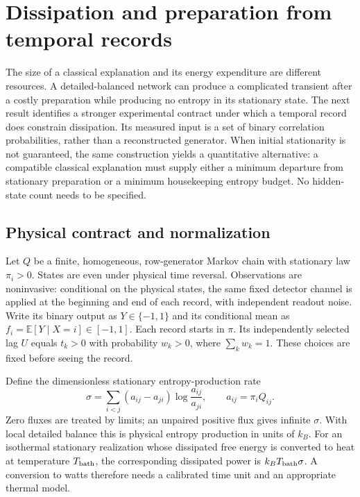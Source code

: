 \chapter{Dissipation and preparation from temporal records}
\label{ch:rf-thermodynamic}

The size of a classical explanation and its energy expenditure are different
resources. A detailed-balanced network can produce a complicated transient
after a costly preparation while producing no entropy in its stationary
state. The next result identifies a stronger experimental contract under which
a temporal record does constrain dissipation. Its measured input is a set of
binary correlation probabilities, rather than a reconstructed generator.
When initial stationarity is not guaranteed, the same construction yields a
quantitative alternative: a compatible classical explanation must supply
either a minimum departure from stationary preparation or a minimum
housekeeping entropy budget. No hidden-state count needs to be specified.

\section{Physical contract and normalization}

Let $Q$ be a finite, homogeneous, row-generator Markov chain with stationary
law $\pi_i>0$. States are even under physical time reversal. Observations are
noninvasive: conditional on the physical states, the same fixed detector
channel is applied at the beginning and end of each record, with independent
readout noise. Write its binary output as $Y\in\{-1,1\}$ and its conditional
mean as $f_i=\mathbb E[Y\mid X=i]\in[-1,1]$. Each record starts in $\pi$.
Its independently selected lag $U$ equals $t_k>0$ with probability $w_k>0$,
where $\sum_k w_k=1$. These choices are fixed before seeing the record.

Define the dimensionless stationary entropy-production rate
\begin{equation}
 \sigma=\sum_{i<j}(a_{ij}-a_{ji})\log\frac{a_{ij}}{a_{ji}},
 \qquad a_{ij}=\pi_iQ_{ij}.
 \label{eq:rf-sigma}
\end{equation}
Zero fluxes are treated by limits; an unpaired positive flux gives infinite
$\sigma$. With local detailed balance this is physical entropy production in
units of $k_B$. For an isothermal stationary realization whose dissipated
free energy is converted to heat at temperature $T_{\rm bath}$, the
corresponding dissipated power is $k_BT_{\rm bath}\sigma$. A conversion to
watts therefore needs a calibrated time unit and an appropriate thermal model.

